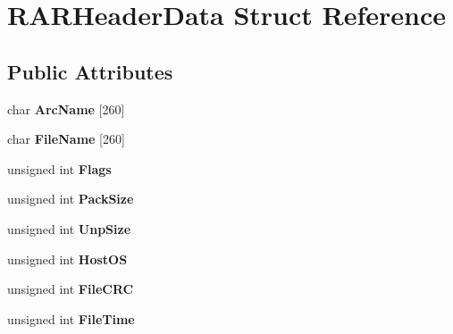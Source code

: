\hypertarget{struct_r_a_r_header_data}{\section{R\-A\-R\-Header\-Data Struct Reference}
\label{struct_r_a_r_header_data}
}
\subsection*{Public Attributes}
\begin{DoxyCompactItemize}
\item 
\hypertarget{struct_r_a_r_header_data_a7160fc4b024345a5d717db6244e76210}{char {\bfseries Arc\-Name} \mbox{[}260\mbox{]}}\label{struct_r_a_r_header_data_a7160fc4b024345a5d717db6244e76210}

\item 
\hypertarget{struct_r_a_r_header_data_ac0d79643d09fb6a5009beff077434dc9}{char {\bfseries File\-Name} \mbox{[}260\mbox{]}}\label{struct_r_a_r_header_data_ac0d79643d09fb6a5009beff077434dc9}

\item 
\hypertarget{struct_r_a_r_header_data_ae6e9dff66c3885c90db8e7f72fb0445f}{unsigned int {\bfseries Flags}}\label{struct_r_a_r_header_data_ae6e9dff66c3885c90db8e7f72fb0445f}

\item 
\hypertarget{struct_r_a_r_header_data_a2cc76f112f3dda2e71b29fc43c6cff34}{unsigned int {\bfseries Pack\-Size}}\label{struct_r_a_r_header_data_a2cc76f112f3dda2e71b29fc43c6cff34}

\item 
\hypertarget{struct_r_a_r_header_data_a2d3cfc602d3d377bb8e20d3c25307372}{unsigned int {\bfseries Unp\-Size}}\label{struct_r_a_r_header_data_a2d3cfc602d3d377bb8e20d3c25307372}

\item 
\hypertarget{struct_r_a_r_header_data_abeb769362fbf7ee506091f1832201ca8}{unsigned int {\bfseries Host\-O\-S}}\label{struct_r_a_r_header_data_abeb769362fbf7ee506091f1832201ca8}

\item 
\hypertarget{struct_r_a_r_header_data_a85d50537aea7c098b255b4c16fe7856d}{unsigned int {\bfseries File\-C\-R\-C}}\label{struct_r_a_r_header_data_a85d50537aea7c098b255b4c16fe7856d}

\item 
\hypertarget{struct_r_a_r_header_data_a0acbfcbabbd7a3863cb3137df72c1ff8}{unsigned int {\bfseries File\-Time}}\label{struct_r_a_r_header_data_a0acbfcbabbd7a3863cb3137df72c1ff8}


\end{DoxyCompactItemize}
